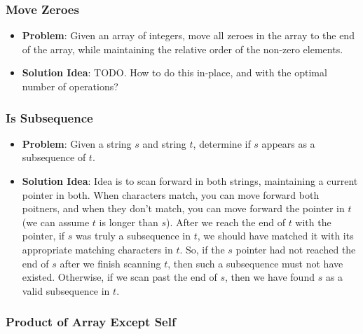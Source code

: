 \documentclass[10pt,a4paper]{article}
\begin{document}
\subsubsection*{Move Zeroes}

\begin{itemize}
    \item \textbf{Problem}: Given an array of integers, move all zeroes in the array to the end of the array, while maintaining the relative order of the non-zero elements.
    \item \textbf{Solution Idea}: TODO. How to do this in-place, and with the optimal number of operations?
\end{itemize}

\subsubsection*{Is Subsequence}

\begin{itemize}
    \item \textbf{Problem}: Given a string $s$ and string $t$, determine if $s$ appears as a subsequence of $t$.
    \item \textbf{Solution Idea}: Idea is to scan forward in both strings, maintaining a current pointer in both. When characters match, you can move forward both poitners, and when they don't match, you can move forward the pointer in $t$ (we can assume $t$ is longer than $s$). After we reach the end of $t$ with the pointer, if $s$ was truly a subsequence in $t$, we should have matched it with its appropriate matching characters in $t$. So, if the $s$ pointer had not reached the end of $s$ after we finish scanning $t$, then such a subsequence must not have existed. Otherwise, if we scan past the end of $s$, then we have found $s$ as a valid subsequence in $t$.
\end{itemize}

\subsubsection*{Product of Array Except Self}
\end{document}

